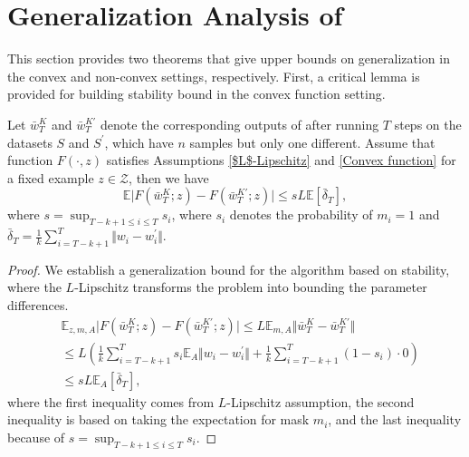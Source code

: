 \section{Generalization Analysis of \method{}}
This section provides two theorems that give upper bounds on generalization in the convex and non-convex settings, respectively. First, a critical lemma is provided for building stability bound in the convex function setting.

\begin{lemma}\label{convex-basic}
Let $\bar{w}_{T}^K$ and $\bar{w}_{T}^{K\prime}$ denote the corresponding outputs of \method{} after running $T$ steps on the datasets $S$ and $S^{\prime}$, which have $n$ samples but only one different. Assume that function $F(\cdot,z)$ satisfies Assumptions \ref{$L$-Lipschitz} and \ref{Convex function} for a fixed example $z\in\mathcal{Z}$, then we have
 \begin{equation}\label{eq_convex-basic}
\mathbb{E}\vert F(\bar{w}_{T}^K;z)-F(\bar{w}_T^{K\prime};z)\vert \leq sL \mathbb{E} [\bar{\delta}_T],
 \end{equation} 
where $s=\sup_{T-k+1\leq i\leq T} s_i$, where $s_i$ denotes the probability of $m_i=1$ and $\bar{\delta}_T=\frac{1}{k}\sum_{i=T-k+1}^{T}\Vert w_i-w_i^{\prime}\Vert$. 
\end{lemma}

\begin{proof} We establish a generalization bound for the algorithm based on stability, where the $L$-Lipschitz transforms the problem into bounding the parameter differences. 
  \begin{equation*}
  \begin{aligned}
  &\mathbb{E}_{z,m,A}\vert F(\bar{w}_{T}^K;z)-F(\bar{w}_T^{K\prime};z) \vert \leq \!L\mathbb{E}_{m,A}\Vert \bar{w}_{T}^K - \bar{w}_T^{K\prime}\Vert\\
  & \leq L \!\left(\!\frac{1}{k}\!\sum_{i=T-k+1}^{T}\!\!s_i \mathbb{E}_{A}\Vert w_i-w_i^{\prime}\Vert+\frac{1}{k}\!\sum_{i=T-k+1}^{T}\!\!(1-s_i)\!\cdot \!0\!\right)\\
  & \leq sL \mathbb{E}_{A} [\bar{\delta}_T], 
  \end{aligned}
 \end{equation*}
where the first inequality comes from $L$-Lipschitz assumption, the second inequality is based on taking the expectation for mask $m_i$, and the last inequality because of $s=\sup_{T-k+1\leq i\leq T} s_i$.
\end{proof}

